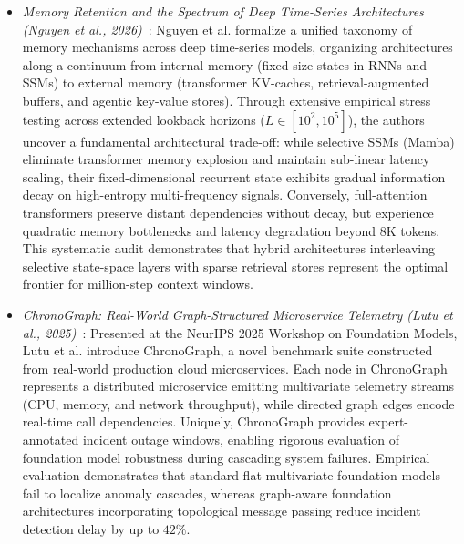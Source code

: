 \begin{itemize}[leftmargin=*]
    \item \emph{Memory Retention and the Spectrum of Deep Time-Series Architectures (Nguyen et al., 2026)}~\cite{nguyen2026memory}: Nguyen et al. formalize a unified taxonomy of memory mechanisms across deep time-series models, organizing architectures along a continuum from internal memory (fixed-size states in RNNs and SSMs) to external memory (transformer KV-caches, retrieval-augmented buffers, and agentic key-value stores). Through extensive empirical stress testing across extended lookback horizons ($L \in [10^2, 10^5]$), the authors uncover a fundamental architectural trade-off: while selective SSMs (Mamba) eliminate transformer memory explosion and maintain sub-linear latency scaling, their fixed-dimensional recurrent state exhibits gradual information decay on high-entropy multi-frequency signals. Conversely, full-attention transformers preserve distant dependencies without decay, but experience quadratic memory bottlenecks and latency degradation beyond $8\text{K}$ tokens. This systematic audit demonstrates that hybrid architectures interleaving selective state-space layers with sparse retrieval stores represent the optimal frontier for million-step context windows.
    \item \emph{ChronoGraph: Real-World Graph-Structured Microservice Telemetry (Lutu et al., 2025)}~\cite{lutu2025chronograph}: Presented at the NeurIPS 2025 Workshop on Foundation Models, Lutu et al. introduce ChronoGraph, a novel benchmark suite constructed from real-world production cloud microservices. Each node in ChronoGraph represents a distributed microservice emitting multivariate telemetry streams (CPU, memory, and network throughput), while directed graph edges encode real-time call dependencies. Uniquely, ChronoGraph provides expert-annotated incident outage windows, enabling rigorous evaluation of foundation model robustness during cascading system failures. Empirical evaluation demonstrates that standard flat multivariate foundation models fail to localize anomaly cascades, whereas graph-aware foundation architectures incorporating topological message passing reduce incident detection delay by up to $42\%$.

\end{itemize}

